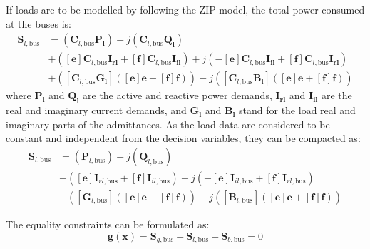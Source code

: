 \documentclass{article}
\begin{document}
If loads are to be modelled by following the ZIP model, the total power consumed at the buses is:
\begin{equation}
    \begin{split}
    \bm{S}_{l,\text{bus}} & = (\bm{C}_{l,\text{bus}}\bm{P_l}) + j (\bm{C}_{l,\text{bus}}\bm{Q_l}) \\
                          & + ([\bm{e}]\bm{C}_{l,\text{bus}} \bm{I_{rl}} + [\bm{f}]\bm{C}_{l,\text{bus}} \bm{I_{il}}) + j(-[\bm{e}]\bm{C}_{l,\text{bus}} \bm{I_{il}} + [\bm{f}]\bm{C}_{l,\text{bus}} \bm{I_{rl}}) \\
                          & + ([\bm{C}_{l,\text{bus}} \bm{G_l}]([\bm{e}]\bm{e} + [\bm{f}]\bm{f})) -j([\bm{C}_{l,\text{bus}} \bm{B_l}]([\bm{e}]\bm{e} + [\bm{f}]\bm{f}))
    \end{split}
\end{equation}
where $\bm{P_l}$ and $\bm{Q_l}$ are the active and reactive power demands, $\bm{I_{rl}}$ and $\bm{I_{il}}$ are the real and imaginary current demands, and $\bm{G_l}$ and $\bm{B_l}$ stand for the load real and imaginary parts of the admittances. As the load data are considered to be constant and independent from the decision variables, they can be compacted as:
\begin{equation}
    \begin{split}
    \bm{S}_{l,\text{bus}} & = (\bm{P}_{l,\text{bus}}) + j (\bm{Q}_{l,\text{bus}}) \\
                          & + ([\bm{e}]\bm{I}_{rl,\text{bus}} + [\bm{f}]\bm{I}_{il,\text{bus}}) + j(-[\bm{e}]\bm{I}_{il,\text{bus}} + [\bm{f}]\bm{I}_{rl,\text{bus}}) \\
                          & + ([\bm{G}_{l,\text{bus}}]([\bm{e}]\bm{e} + [\bm{f}]\bm{f})) -j([\bm{B}_{l,\text{bus}}]([\bm{e}]\bm{e} + [\bm{f}]\bm{f}))
    \end{split}
\end{equation}

The equality constraints can be formulated as:
\begin{equation}
    \bm{g(x)} = \bm{S}_{g,\text{bus}} - \bm{S}_{l,\text{bus}} - \bm{S}_{b,\text{bus}} = 0
\end{equation}
\end{document}
